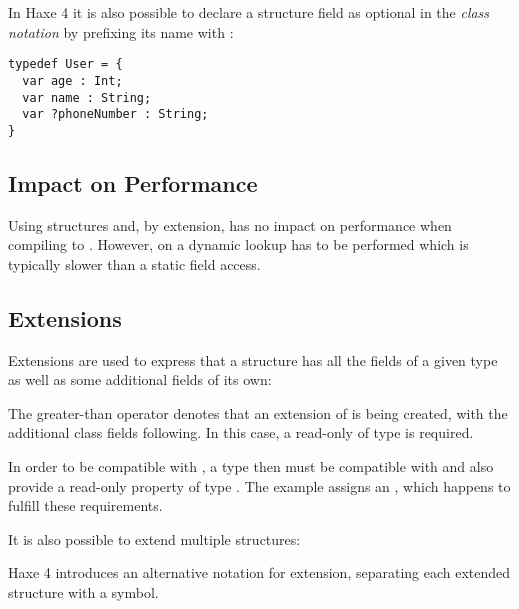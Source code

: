 
In Haxe 4 it is also possible to declare a structure field as optional in the \emph{class notation} by prefixing its name with :

\begin{lstlisting}
typedef User = {
  var age : Int;
  var name : String;
  var ?phoneNumber : String;
}
\end{lstlisting}



\subsection{Impact on Performance}
\label{types-structure-performance}

Using structures and, by extension,  has no impact on performance when compiling to . However, on  a dynamic lookup has to be performed which is typically slower than a static field access.

\subsection{Extensions}
\label{types-structure-extensions}

Extensions are used to express that a structure has all the fields of a given type as well as some additional fields of its own:

The greater-than operator \expr{>} denotes that an extension of  is being created, with the additional class fields following. In this case, a read-only   of type  is required.

In order to be compatible with , a type then must be compatible with  and also provide a read-only  property of type . The example assigns an , which happens to fulfill these requirements.


It is also possible to extend multiple structures:



Haxe 4 introduces an alternative notation for extension, separating each extended structure with a \expr{\&} symbol.

